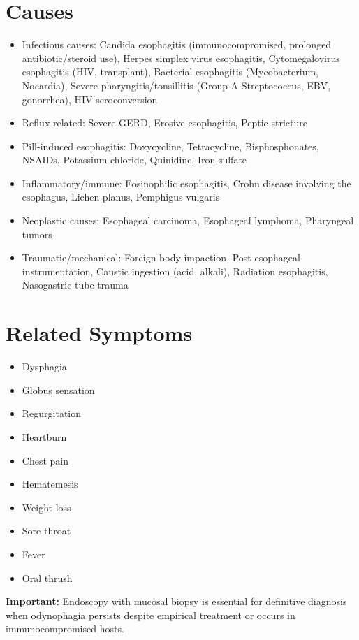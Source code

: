 \section*{Causes}
\begin{itemize}
  \item Infectious causes: Candida esophagitis (immunocompromised, prolonged antibiotic/steroid use), Herpes simplex virus esophagitis, Cytomegalovirus esophagitis (HIV, transplant), Bacterial esophagitis (Mycobacterium, Nocardia), Severe pharyngitis/tonsillitis (Group A Streptococcus, EBV, gonorrhea), HIV seroconversion
  \item Reflux-related: Severe GERD, Erosive esophagitis, Peptic stricture
  \item Pill-induced esophagitis: Doxycycline, Tetracycline, Bisphosphonates, NSAIDs, Potassium chloride, Quinidine, Iron sulfate
  \item Inflammatory/immune: Eosinophilic esophagitis, Crohn disease involving the esophagus, Lichen planus, Pemphigus vulgaris
  \item Neoplastic causes: Esophageal carcinoma, Esophageal lymphoma, Pharyngeal tumors
  \item Traumatic/mechanical: Foreign body impaction, Post-esophageal instrumentation, Caustic ingestion (acid, alkali), Radiation esophagitis, Nasogastric tube trauma
\end{itemize}

\section*{Related Symptoms}
\begin{itemize}
  \item Dysphagia
  \item Globus sensation
  \item Regurgitation
  \item Heartburn
  \item Chest pain
  \item Hematemesis
  \item Weight loss
  \item Sore throat
  \item Fever
  \item Oral thrush
\end{itemize}
\textbf{Important:} Endoscopy with mucosal biopsy is essential for definitive diagnosis when odynophagia persists despite empirical treatment or occurs in immunocompromised hosts.

